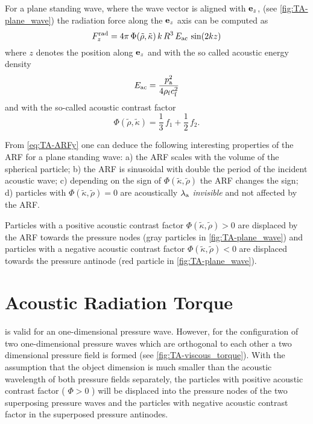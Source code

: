 For a plane standing wave, where the wave vector is aligned with $\vb{e}_{z}$, (see 
\cref{fig:TA-plane_wave}) the radiation force along the $\vb{e}_{z}$ axis can be 
computed as~\cite{Bruus2012}
\begin{equation}
  F_{z}^{\mathrm{rad}} = 
  4\pi\,\Phi(\tilde{\rho},\tilde{\kappa})\,k\,R^{3}\,E_{\mathrm{ac}}\,\sin(2kz)
  \label{eq:TA-ARFy}
\end{equation}
where $z$ denotes the position along $\vb{e}_{z}$ and with the so called acoustic 
energy density
\begin{equation}
  E_{\mathrm{ac}} = \frac{p_{\mathrm{a}}^{2}}{4\rho_{\mathrm{f}}c_{\mathrm{f}}^{2}}
  \label{eq:TA-Eac}
\end{equation}
and with the so-called acoustic contrast factor
\begin{equation}
  \Phi(\tilde{\rho},\tilde{\kappa}) = \frac{1}{3}\,f_{1} + \frac{1}{2}\,f_{2}.
  \label{eq:TA-Phi}
\end{equation}

From \cref{eq:TA-ARFy} one can deduce the following interesting properties of 
the ARF for a plane standing wave: a) the ARF scales with the volume of the 
spherical particle; b) the ARF is sinusoidal with double the period of the 
incident acoustic wave; c) depending on the sign of $\Phi(\tilde{\kappa}, 
\tilde{\rho})$ the ARF changes the sign; d) particles with 
$\Phi(\tilde{\kappa}, \tilde{\rho}) = 0$ are acoustically 
$\lambda_{\mathrm{a}}$
\emph{invisible} and not affected by the ARF.

Particles with a positive acoustic contrast factor $\Phi(\tilde{\kappa}, 
\tilde{\rho}) > 0$ are displaced by the ARF towards the pressure nodes (gray 
particles in \cref{fig:TA-plane_wave}) and particles with a negative acoustic 
contrast factor $\Phi(\tilde{\kappa}, \tilde{\rho}) < 0$ are displaced towards 
the pressure antinode (red particle in \cref{fig:TA-plane_wave}).



\section{Acoustic Radiation Torque\label{sec:TA-VT}}

 is valid for an one-dimensional pressure wave. However, for 
the configuration of two one-dimensional pressure waves which are orthogonal to 
each other a two dimensional pressure field is formed (see 
\cref{fig:TA-viscous_torque}). With the assumption that the object dimension is 
much smaller than the acoustic wavelength of both pressure fields separately, 
the particles with positive acoustic contrast factor ( $\Phi>0$ ) will be 
displaced into the pressure nodes of the two superposing pressure waves and the 
particles with negative acoustic contrast factor in the superposed pressure 
antinodes.

